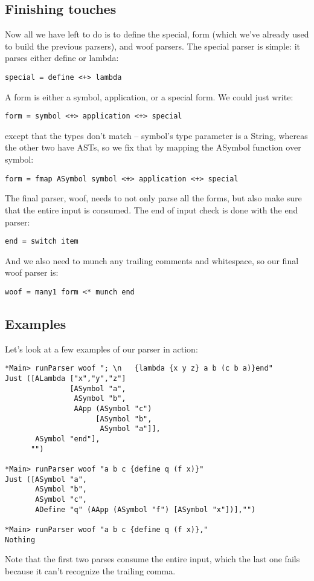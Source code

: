 \documentclass{tmr}
\begin{document}
\subsection{Finishing touches}
Now all we have left to do is to define the special, form (which we've already used to build
the previous parsers), and woof parsers.  The special parser is simple:  it parses either 
define or lambda:
\begin{verbatim}
special = define <+> lambda
\end{verbatim}

A form is either a symbol, application, or a special form.  We could just write:
\begin{verbatim}
form = symbol <+> application <+> special
\end{verbatim}

except that the types don't match -- symbol's type parameter is a String, whereas the other two
have ASTs, so we fix that by mapping the ASymbol function over symbol:
\begin{verbatim}
form = fmap ASymbol symbol <+> application <+> special
\end{verbatim}

The final parser, woof, needs to not only parse all the forms, but also make sure that the
entire input is consumed.  The end of input check is done with the end parser:
\begin{verbatim}
end = switch item
\end{verbatim}

And we also need to munch any trailing comments and whitespace, so our final woof parser is:
\begin{verbatim}
woof = many1 form <* munch end
\end{verbatim}

\subsection{Examples}
Let's look at a few examples of our parser in action:
\begin{verbatim}
*Main> runParser woof "; \n   {lambda {x y z} a b (c b a)}end"
Just ([ALambda ["x","y","z"] 
               [ASymbol "a",
                ASymbol "b",
                AApp (ASymbol "c") 
                     [ASymbol "b",
                      ASymbol "a"]],
       ASymbol "end"],
      "")

*Main> runParser woof "a b c {define q (f x)}"
Just ([ASymbol "a",
       ASymbol "b",
       ASymbol "c",
       ADefine "q" (AApp (ASymbol "f") [ASymbol "x"])],"")

*Main> runParser woof "a b c {define q (f x)},"
Nothing
\end{verbatim}
Note that the first two parses consume the entire input, which the last one 
fails because it can't recognize the trailing comma.
\end{document}
